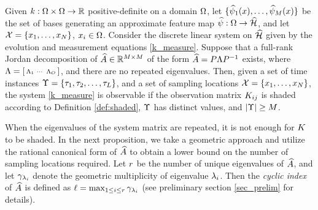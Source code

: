 \begin{proposition}\label{prop:1}
Given $k:\Omega\times\Omega\to\mathbb{R}$ positive-definite on a domain $\Omega$, let $\{\widehat{\psi}_1(x), \dots, \widehat{\psi}_{M}(x)\}$ be the set of bases generating an approximate feature map $\widehat{\psi}:\Omega\to\widehat{\mathcal{H}}$, and let
$\mathcal{X} = \{x_1, \dots, x_{N}\}$, $x_i\in\Omega$. Consider the discrete linear system on $\widehat{\mathcal{H}}$ given by the evolution and measurement equations \eqref{k_measure}. Suppose that a full-rank Jordan decomposition of $\widehat{A}\in\mathbb{R}^{M\times M}$ of the form $\widehat{A} = P\Lambda P^{-1}$ exists, where $\Lambda = 
\left[\begin{smallmatrix}\Lambda_1 &\cdots & \Lambda_{O}\end{smallmatrix}\right]$,
and there are no repeated eigenvalues. Then, given a set of time instances  $\Upsilon = \{\tau_1,\tau_2,\dots,\tau_{L}\}$, and a set of sampling locations $\mathcal{X}=\{x_1, \dots, x_{N}\}$,
the system \eqref{k_measure} is observable if the observation matrix $K_{ij}$ is shaded according to Definition \ref{def:shaded},
$\Upsilon$ has distinct values, and $|\Upsilon| \geq M$.
\end{proposition}
When the eigenvalues of the system matrix are repeated, it is not enough for $K$ to be shaded. 
In the next proposition, we take a geometric approach and utilize the rational canonical form  of $\widehat{A}$ to obtain a lower bound on the number of sampling locations required. Let $r$ be the number of unique eigenvalues of $\widehat{A}$, and let $\gamma_{\lambda_i}$ denote the geometric multiplicity of eigenvalue $\lambda_i$. Then the \emph{cyclic index} of $\widehat{A}$ is defined as $\ell = \max_{1\leq i\leq r}{\gamma_{\lambda_i}}$\cite{wonham1974linear} (see preliminary section \ref{sec_prelim} for details).
